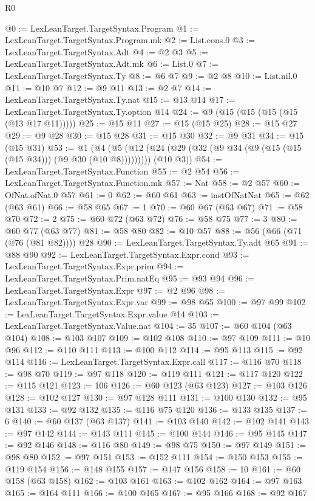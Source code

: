 \begin{lexlean}{R0}
\begin{coremodule}
@0 := LexLeanTarget.TargetSyntax.Program
@1 := LexLeanTarget.TargetSyntax.Program.mk
@2 := List.cons.{0}
@3 := LexLeanTarget.TargetSyntax.Adt
@4 := @2 @3
@5 := LexLeanTarget.TargetSyntax.Adt.mk
@6 := List.{0}
@7 := LexLeanTarget.TargetSyntax.Ty
@8 := @6 @7
@9 := @2 @8
@10 := List.nil.{0}
@11 := @10 @7
@12 := @9 @11
@13 := @2 @7
@14 := LexLeanTarget.TargetSyntax.Ty.nat
@15 := @13 @14
@17 := LexLeanTarget.TargetSyntax.Ty.option @14
@24 := @9 (@15 (@15 (@15 (@15 (@13 @17 @11)))))
@25 := @15 @11
@27 := @15 (@15 @25)
@28 := @15 @27
@29 := @9 @28
@30 := @15 @28
@31 := @15 @30
@32 := @9 @31
@34 := @15 (@15 @31)
@53 := @1
    (@4 (@5 (@12 (@24 (@29 (@32 (@9 @34 (@9 (@15 (@15 (@15 @34))) (@9 @30 (@10 @8))))))))) (@10 @3))
@54 := LexLeanTarget.TargetSyntax.Function
@55 := @2 @54
@56 := LexLeanTarget.TargetSyntax.Function.mk
@57 := Nat
@58 := @2 @57
@60 := OfNat.ofNat.{0} @57
@61 := 0
@62 := @60 @61
@63 := instOfNatNat
@65 := @62 (@63 @61)
@66 := @58 @65
@67 := 1
@70 := @60 @67 (@63 @67)
@71 := @58 @70
@72 := 2
@75 := @60 @72 (@63 @72)
@76 := @58 @75
@77 := 3
@80 := @60 @77 (@63 @77)
@81 := @58 @80
@82 := @10 @57
@88 := @56 (@66 (@71 (@76 (@81 @82)))) @28
@90 := LexLeanTarget.TargetSyntax.Ty.adt @65
@91 := @88 @90
@92 := LexLeanTarget.TargetSyntax.Expr.cond
@93 := LexLeanTarget.TargetSyntax.Expr.prim
@94 := LexLeanTarget.TargetSyntax.Prim.natEq
@95 := @93 @94
@96 := LexLeanTarget.TargetSyntax.Expr
@97 := @2 @96
@98 := LexLeanTarget.TargetSyntax.Expr.var
@99 := @98 @65
@100 := @97 @99
@102 := LexLeanTarget.TargetSyntax.Expr.value @14
@103 := LexLeanTarget.TargetSyntax.Value.nat
@104 := 35
@107 := @60 @104 (@63 @104)
@108 := @103 @107
@109 := @102 @108
@110 := @97 @109
@111 := @10 @96
@112 := @110 @111
@113 := @100 @112
@114 := @95 @113
@115 := @92 @114
@116 := LexLeanTarget.TargetSyntax.Expr.call
@117 := @116 @70
@118 := @98 @70
@119 := @97 @118
@120 := @119 @111
@121 := @117 @120
@122 := @115 @121
@123 := 106
@126 := @60 @123 (@63 @123)
@127 := @103 @126
@128 := @102 @127
@130 := @97 @128 @111
@131 := @100 @130
@132 := @95 @131
@133 := @92 @132
@135 := @116 @75 @120
@136 := @133 @135
@137 := 6
@140 := @60 @137 (@63 @137)
@141 := @103 @140
@142 := @102 @141
@143 := @97 @142
@144 := @143 @111
@145 := @100 @144
@146 := @95 @145
@147 := @92 @146
@148 := @116 @80
@149 := @98 @75
@150 := @97 @149
@151 := @98 @80
@152 := @97 @151
@153 := @152 @111
@154 := @150 @153
@155 := @119 @154
@156 := @148 @155
@157 := @147 @156
@158 := 10
@161 := @60 @158 (@63 @158)
@162 := @103 @161
@163 := @102 @162
@164 := @97 @163
@165 := @164 @111
@166 := @100 @165
@167 := @95 @166
@168 := @92 @167

\end{coremodule}
\end{lexlean}
